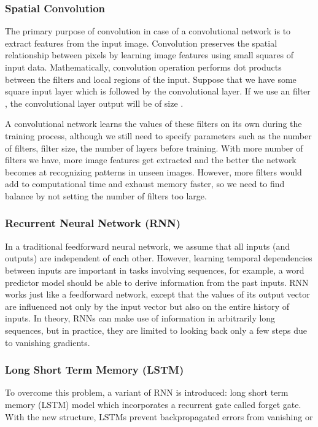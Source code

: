 \documentclass[a4paper]{article}
\begin{document}
\subsubsection{Spatial Convolution}

The primary purpose of convolution in case of a convolutional network is to extract features from the input image. Convolution preserves the spatial relationship between pixels by learning image features using small squares of input data. Mathematically, convolution operation performs dot products between the filters and local regions of the input. Suppose that we have some  square input layer which is followed by the convolutional layer. If we use an  filter , the convolutional layer output will be of size . 

A convolutional network learns the values of these filters on its own during the training process, although we still need to specify parameters such as the number of filters, filter size, the number of layers before training. With more number of filters we have, more image features get extracted and the better the network becomes at recognizing patterns in unseen images. However, more filters would add to computational time and exhaust memory faster, so we need to find balance by not setting the number of filters too large.

\subsubsection{Recurrent Neural Network (RNN)}

In a traditional feedforward neural network, we assume that all inputs (and outputs) are independent of each other. However, learning temporal dependencies between inputs are important in tasks involving sequences, for example, a word predictor model should be able to derive information from the past inputs. RNN works just like a feedforward network, except that the values of its output vector are influenced not only by the input vector but also on the entire history of inputs. In theory, RNNs can make use of information in arbitrarily long sequences, but in practice, they are limited to looking back only a few steps due to vanishing gradients. 

\subsubsection{Long Short Term Memory (LSTM)}

To overcome this problem, a variant of RNN is introduced: long short term memory (LSTM) model which incorporates a recurrent gate called forget gate. With the new structure, LSTMs prevent backpropagated errors from vanishing or exploding, thus can work on long sequences and they can be stacked together to capture higher level information. The formulation of a typical LSTM unit is summarized with Figure \ref{fig:lstm} and equations (1) through (6).
\end{document}
